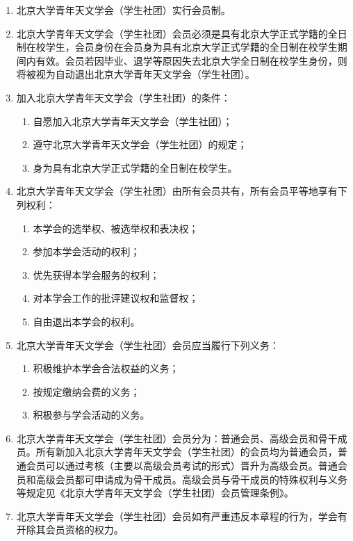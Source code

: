 \begin{enumerate}[resume]
    \item 北京大学青年天文学会（学生社团）实行会员制。
    
    \item 北京大学青年天文学会（学生社团）会员必须是具有北京大学正式学籍的全日制在校学生，会员身份在会员身为具有北京大学正式学籍的全日制在校学生期间内有效。会员若因毕业、退学等原因失去北京大学全日制在校学生身份，则将被视为自动退出北京大学青年天文学会（学生社团）。
    
    \item 加入北京大学青年天文学会（学生社团）的条件：
    
    \begin{enumerate}
        \item 自愿加入北京大学青年天文学会（学生社团）；
        \item 遵守北京大学青年天文学会（学生社团）的规定；
        \item 身为具有北京大学正式学籍的全日制在校学生。
    \end{enumerate} %
    
    \item 北京大学青年天文学会（学生社团）由所有会员共有，所有会员平等地享有下列权利：
    
    \begin{enumerate}
        \item 本学会的选举权、被选举权和表决权；
        \item 参加本学会活动的权利；
        \item 优先获得本学会服务的权利；
        \item 对本学会工作的批评建议权和监督权；
        \item 自由退出本学会的权利。
    \end{enumerate}
    
    \item 北京大学青年天文学会（学生社团）会员应当履行下列义务：
    
    \begin{enumerate}
        \item 积极维护本学会合法权益的义务；
        \item 按规定缴纳会费的义务；
        \item 积极参与学会活动的义务。
    \end{enumerate}
    
    \item 北京大学青年天文学会（学生社团）会员分为：普通会员、高级会员和骨干成员。所有新加入北京大学青年天文学会（学生社团）的会员均为普通会员，普通会员可以通过考核（主要以高级会员考试的形式）晋升为高级会员。普通会员和高级会员都可申请成为骨干成员。高级会员与骨干成员的特殊权利与义务等规定见《北京大学青年天文学会（学生社团）会员管理条例》。
    
    \item 北京大学青年天文学会（学生社团）会员如有严重违反本章程的行为，学会有开除其会员资格的权力。 
\end{enumerate}

